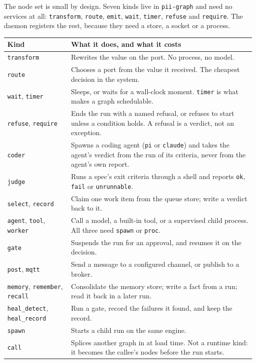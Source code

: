 The node set is small by design. Seven kinds live in \texttt{pii-graph} and need no
services at all: \texttt{transform}, \texttt{route}, \texttt{emit}, \texttt{wait},
\texttt{timer}, \texttt{refuse} and \texttt{require}. The daemon registers the rest,
because they need a store, a socket or a process.

\begin{longtable}{@{}p{}p{}@{}}
	\toprule
	\textbf{Kind} & \textbf{What it does, and what it costs} \\
	\midrule
	\endhead
	\texttt{transform} & Rewrites the value on the port. No process, no model. \\
	\texttt{route} & Chooses a port from the value it received. The cheapest decision in
	the system. \\
	\texttt{wait}, \texttt{timer} & Sleeps, or waits for a wall-clock moment. \texttt{timer}
	is what makes a graph schedulable. \\
	\texttt{refuse}, \texttt{require} & Ends the run with a named refusal, or refuses to
	start unless a condition holds. A refusal is a verdict, not an exception. \\
	\texttt{coder} & Spawns a coding agent (\texttt{pi} or \texttt{claude}) and takes the
	agent's verdict from the run of its criteria, never from the agent's own report. \\
	\texttt{judge} & Runs a spec's exit criteria through a shell and reports
	\texttt{ok}, \texttt{fail} or \texttt{unrunnable}. \\
	\texttt{select}, \texttt{record} & Claim one work item from the queue store; write a
	verdict back to it. \\
	\texttt{agent}, \texttt{tool}, \texttt{worker} & Call a model, a built-in tool, or a
	supervised child process. All three need \texttt{spawn} or \texttt{proc}. \\
	\texttt{gate} & Suspends the run for an approval, and resumes it on the decision. \\
	\texttt{post}, \texttt{mqtt} & Send a message to a configured channel, or publish to a
	broker. \\
	\texttt{memory}, \texttt{remember}, \texttt{recall} & Consolidate the memory store;
	write a fact from a run; read it back in a later run. \\
	\texttt{heal\_detect}, \texttt{heal\_record} & Run a gate, record the failures it
	found, and keep the record. \\
	\texttt{spawn} & Starts a child run on the same engine. \\
	\texttt{call} & Splices another graph in at load time. Not a runtime kind: it becomes
	the callee's nodes before the run starts. \\
	\bottomrule
\end{longtable}

